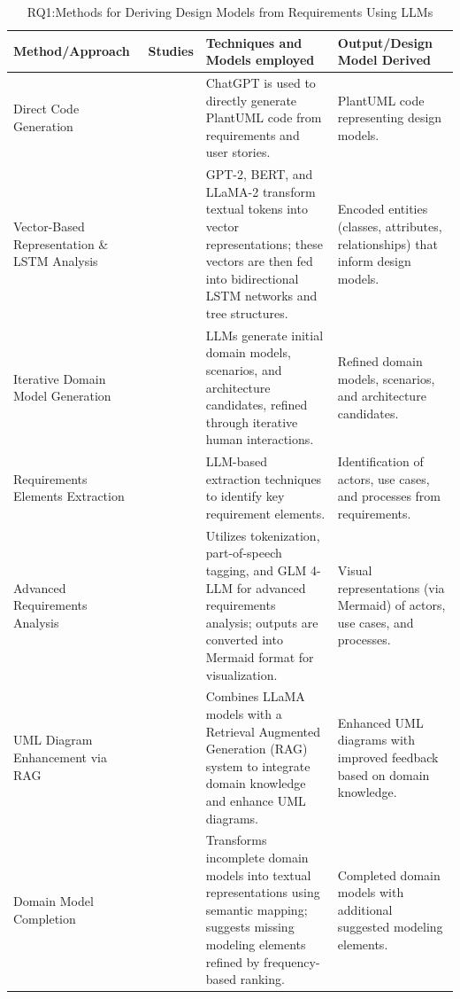 \begin{table}[htb]
\centering
\small
\renewcommand{\arraystretch}{0.9} %
\setlength{\tabcolsep}{4pt}
\label{tab:llm-methods}
\begin{tabular}{p{3cm} p{2cm} p{5cm} p{3.5cm}}
\toprule
\textbf{Method/Approach} & \textbf{Studies} & \textbf{Techniques and Models employed} & \textbf{Output/Design Model Derived} \\
\midrule
Direct Code Generation &  \cite{1deBari2024, 4jahan2024,5ferrari2024} & ChatGPT is used to directly generate PlantUML code from requirements and user stories. & PlantUML code representing design models. \\
\midrule
Vector-Based Representation \& LSTM Analysis & \cite{2babaalla2024} & GPT-2, BERT, and LLaMA-2 transform textual tokens into vector representations; these vectors are then fed into bidirectional LSTM networks and tree structures. & Encoded entities (classes, attributes, relationships) that inform design models. \\
\midrule
Iterative Domain Model Generation & \cite{7eisenreich2024} & LLMs generate initial domain models, scenarios, and architecture candidates, refined through iterative human interactions. & Refined domain models, scenarios, and architecture candidates. \\
\midrule
Requirements Elements Extraction & \cite{9ruan2023,11omar2023,12li2024} & LLM-based extraction techniques to identify key requirement elements. & Identification of actors, use cases, and processes from requirements. \\
\midrule
Advanced Requirements Analysis & \cite{8z_wang2024}& Utilizes tokenization, part-of-speech tagging, and GLM 4-LLM for advanced requirements analysis; outputs are converted into Mermaid format for visualization. & Visual representations (via Mermaid) of actors, use cases, and processes. \\
\midrule
UML Diagram Enhancement via RAG & \cite{13benardi2024} & Combines LLaMA models with a Retrieval Augmented Generation (RAG) system to integrate domain knowledge and enhance UML diagrams. & Enhanced UML diagrams with improved feedback based on domain knowledge. \\
\midrule
Domain Model Completion & \cite{14chaaben2023} & Transforms incomplete domain models into textual representations using semantic mapping; suggests missing modeling elements refined by frequency-based ranking. & Completed domain models with additional suggested modeling elements. \\
\bottomrule
\end{tabular}
\caption{RQ1:Methods for Deriving Design Models from Requirements Using LLMs}
\end{table}

